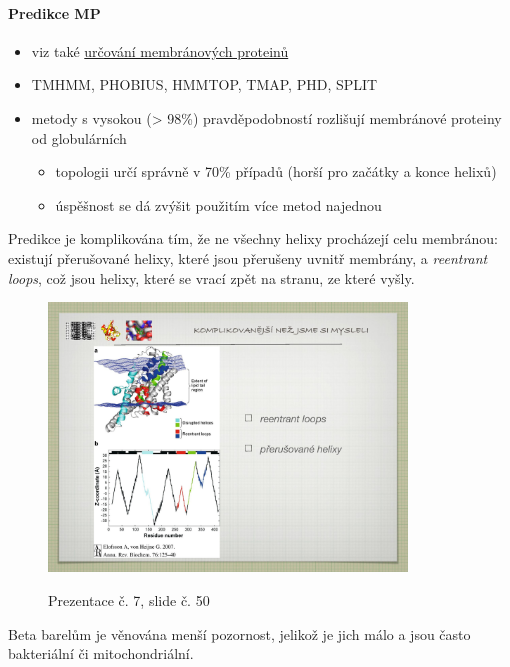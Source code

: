 \documentclass[DIV=8]{scrreprt}
\begin{document}
\paragraph{Predikce MP}
\begin{itemize}[nosep]
    \item viz také \hyperref[Určování membránových proteinů]{určování membránových proteinů}
    \item TMHMM, PHOBIUS, HMMTOP, TMAP, PHD, SPLIT
    \item metody s vysokou (> 98\%) pravděpodobností rozlišují membránové proteiny od globulárních
\begin{itemize}[nosep]
    \item topologii určí správně v 70\% případů (horší pro začátky a konce helixů)
    \item úspěšnost se dá zvýšit použitím více metod najednou
\end{itemize}

\end{itemize}



Predikce je komplikována tím, že ne všechny helixy procházejí celu membránou: existují přerušované helixy, které jsou přerušeny uvnitř membrány, a \emph{reentrant loops}, což jsou helixy, které se vrací zpět na stranu, ze které vyšly. \begin{figure}
    \caption{Prezentace č. 7, slide č. 50}
    \includegraphics[width=0.85\textwidth]{slides-7/slide-50.jpg}
    \centering
    \label{slides-7-slide-50}
\end{figure}


Beta barelům je věnována menší pozornost, jelikož je jich málo a jsou často bakteriální či mitochondriální.
\end{document}
